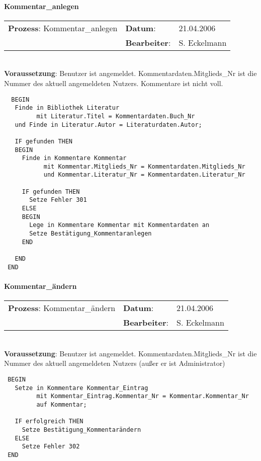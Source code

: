 \paragraph{Kommentar\_anlegen}
\begin{tabular}[t]{p{9.5cm}ll}
\textbf{Prozess}: Kommentar\_anlegen  	&\textbf{Datum}:      &21.04.2006\\
					&\textbf{Bearbeiter}: &S. Eckelmann\\
\end{tabular}

\hrulefill\\
\textbf{Voraussetzung}: Benutzer ist angemeldet. Kommentardaten.Mitglieds\_Nr ist die Nummer des aktuell angemeldeten Nutzers. Kommentare ist nicht voll.
\begin{verbatim}
  BEGIN
   Finde in Bibliothek Literatur
         mit Literatur.Titel = Kommentardaten.Buch_Nr
   und Finde in Literatur.Autor = Literaturdaten.Autor;
 
   IF gefunden THEN
   BEGIN
     Finde in Kommentare Kommentar
           mit Kommentar.Mitglieds_Nr = Kommentardaten.Mitglieds_Nr
           und Kommentar.Literatur_Nr = Kommentardaten.Literatur_Nr

     IF gefunden THEN
       Setze Fehler 301
     ELSE
     BEGIN
       Lege in Kommentare Kommentar mit Kommentardaten an
       Setze Bestätigung_Kommentaranlegen
     END

   END
 END
\end{verbatim}
\hrulefill



\paragraph{Kommentar\_ändern}
\begin{tabular}[t]{p{9.5cm}ll}
\textbf{Prozess}: Kommentar\_ändern  	&\textbf{Datum}:      &21.04.2006\\
					&\textbf{Bearbeiter}: &S. Eckelmann\\
\end{tabular}

\hrulefill\\
\textbf{Voraussetzung}: Benutzer ist angemeldet. Kommentardaten.Mitglieds\_Nr ist die Nummer des aktuell angemeldeten Nutzers (außer er ist Administrator)
\begin{verbatim}
 BEGIN
   Setze in Kommentare Kommentar_Eintrag
         mit Kommentar_Eintrag.Kommentar_Nr = Kommentar.Kommentar_Nr
         auf Kommentar;
  
   IF erfolgreich THEN
     Setze Bestätigung_Kommentarändern
   ELSE
     Setze Fehler 302
 END
\end{verbatim}
\hrulefill




